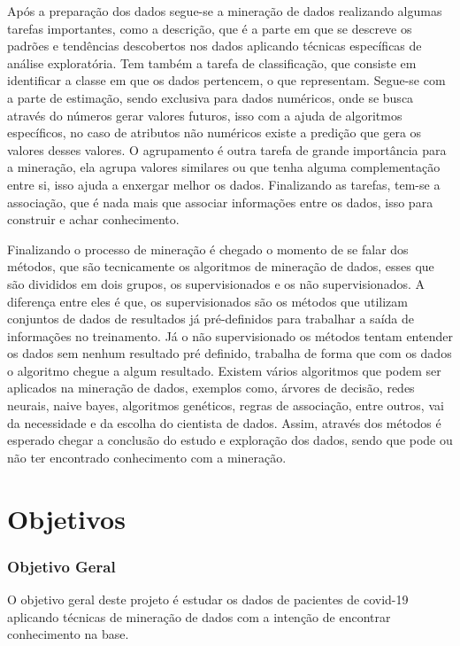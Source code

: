 \documentclass[tcc1]{uftex}
\begin{document}
Após a preparação dos dados segue-se a mineração de dados realizando algumas tarefas importantes, como a descrição, que é a parte em que se descreve os padrões e tendências descobertos nos dados aplicando técnicas específicas de análise exploratória. Tem também a tarefa de classificação, que consiste em identificar a classe em que os dados pertencem, o que representam. Segue-se com a parte de estimação, sendo exclusiva para dados numéricos, onde se busca através do números gerar valores futuros, isso com a ajuda de algoritmos específicos, no caso de atributos não numéricos existe a predição que gera os valores desses valores. O agrupamento é outra tarefa de grande importância para a mineração, ela agrupa valores similares ou que tenha alguma complementação entre si, isso ajuda a enxergar melhor os dados. Finalizando as tarefas, tem-se a associação, que é nada mais que associar informações entre os dados, isso para construir e achar conhecimento.\cite{camilo2009mineraccao} 

Finalizando o processo de mineração é chegado o momento de se falar dos métodos, que são tecnicamente os algoritmos de mineração de dados, esses que são divididos em dois grupos, os supervisionados e os não supervisionados. A diferença entre eles é que, os supervisionados são os métodos que utilizam conjuntos de dados de resultados já pré-definidos para trabalhar a saída de informações no treinamento. Já o não supervisionado os métodos tentam entender os dados sem nenhum resultado pré definido, trabalha de forma que com os dados o algoritmo chegue a algum resultado.\cite{camilo2009mineraccao}  Existem vários algoritmos que podem ser aplicados na mineração de dados, exemplos como, árvores de decisão, redes neurais, naive bayes, algoritmos genéticos, regras de associação, entre outros, vai da necessidade e da escolha do cientista de dados. Assim, através dos métodos é esperado chegar a conclusão do estudo e exploração dos dados, sendo que pode ou não ter encontrado conhecimento com a mineração.



\chapter{Objetivos}
\subsection*{Objetivo Geral}
O objetivo geral deste projeto é estudar os dados de pacientes de covid-19 aplicando técnicas de mineração de dados com a intenção de encontrar conhecimento na base.
\end{document}

